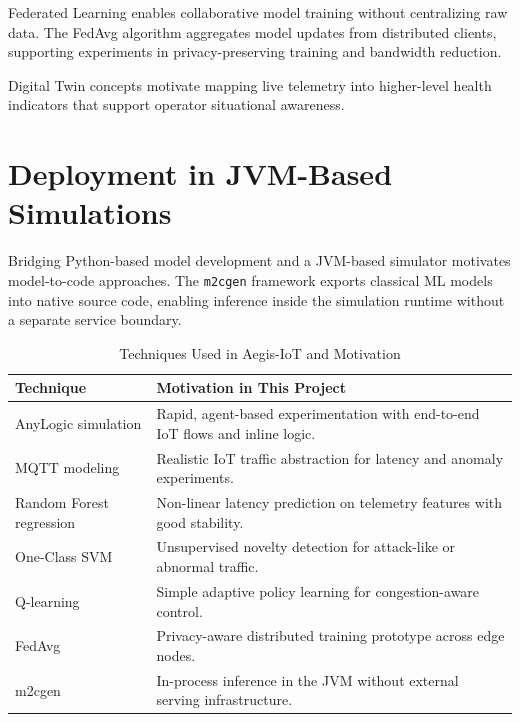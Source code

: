 Federated Learning \cite{fedavg} enables collaborative model training without centralizing raw data. The FedAvg algorithm aggregates model updates from distributed clients, supporting experiments in privacy-preserving training and bandwidth reduction.

Digital Twin concepts \cite{digitaltwin} motivate mapping live telemetry into higher-level health indicators that support operator situational awareness.

\section{Deployment in JVM-Based Simulations}

Bridging Python-based model development and a JVM-based simulator motivates model-to-code approaches. The \texttt{m2cgen} framework \cite{m2cgen} exports classical ML models into native source code, enabling inference inside the simulation runtime without a separate service boundary.

\begin{table}[H]
\centering
\caption{Techniques Used in Aegis-IoT and Motivation}
\label{tab:lit_summary}
\begin{tabularx}{\textwidth}{@{}lX@{}}
\toprule
\textbf{Technique} & \textbf{Motivation in This Project} \\
\midrule
AnyLogic simulation \cite{anylogic} & Rapid, agent-based experimentation with end-to-end IoT flows and inline logic. \\
MQTT modeling \cite{mqtt} & Realistic IoT traffic abstraction for latency and anomaly experiments. \\
Random Forest regression \cite{rf} & Non-linear latency prediction on telemetry features with good stability. \\
One-Class SVM \cite{ocsvm} & Unsupervised novelty detection for attack-like or abnormal traffic. \\
Q-learning \cite{qlearning} & Simple adaptive policy learning for congestion-aware control. \\
FedAvg \cite{fedavg} & Privacy-aware distributed training prototype across edge nodes. \\
m2cgen \cite{m2cgen} & In-process inference in the JVM without external serving infrastructure. \\
\bottomrule
\end{tabularx}
\end{table}
